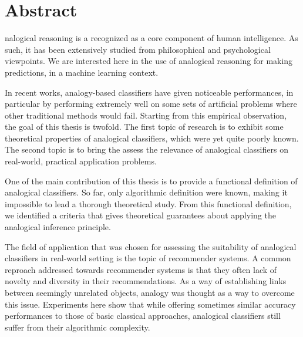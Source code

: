 \chapter*{Abstract}

nalogical reasoning is a recognized as a core component of human intelligence.
As such, it has been extensively studied from philosophical and psychological
viewpoints. We are interested here in the use of analogical reasoning for
making predictions, in a machine learning context.

In recent works, analogy-based classifiers have given noticeable performances,
in particular by performing extremely well on some sets of artificial problems
where other traditional methods would fail. Starting from this empirical
observation, the goal of this thesis is twofold. The first topic of research is
to exhibit some theoretical properties of analogical classifiers, which were
yet quite poorly known. The second topic is to bring the assess the relevance
of analogical classifiers on real-world, practical application problems.

One of the main contribution of this thesis is to provide a functional
definition of analogical classifiers. So far, only algorithmic definition were
known, making it impossible to lead a thorough theoretical study. From this
functional definition, we identified a criteria that gives theoretical
guarantees about applying the analogical inference principle.

The field of application that was chosen for assessing the suitability of
analogical classifiers in real-world setting is the topic of recommender
systems. A common reproach addressed towards recommender systems is that they
often lack of novelty and diversity in their recommendations. As a way of
establishing links between seemingly unrelated objects, analogy was thought as
a way to overcome this issue. Experiments here show that while offering
sometimes similar accuracy performances to those of basic classical approaches,
analogical classifiers still suffer from their algorithmic complexity.
